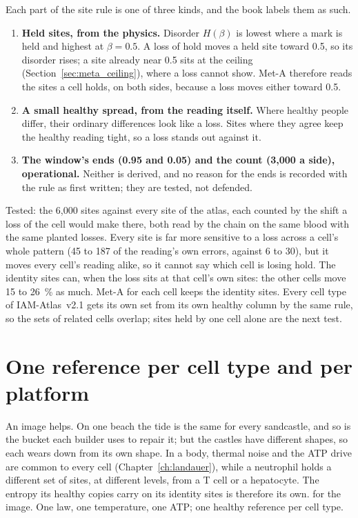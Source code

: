 Each part of the site rule is one of three kinds, and the book labels them as such.
\begin{enumerate}
\item \textbf{Held sites, from the physics.} Disorder $H(\beta)$ is lowest where a mark is held and highest at $\beta=0.5$. A loss of hold
      moves a held site toward 0.5, so its disorder rises; a site already near 0.5 sits at the ceiling (Section~\ref{sec:meta_ceiling}),
      where a loss cannot show. Met-A therefore reads the sites a cell holds, on both sides, because a loss moves either toward 0.5. \derived
\item \textbf{A small healthy spread, from the reading itself.} Where healthy people differ, their ordinary differences look like a loss.
      Sites where they agree keep the healthy reading tight, so a loss stands out against it.
\item \textbf{The window's ends (0.95 and 0.05) and the count (3,000 a side), operational.} Neither is derived, and no reason for the ends is
      recorded with the rule as first written; they are tested, not defended. \openprob
\end{enumerate}
Tested: the 6,000 sites against every site of the atlas, each counted by the shift a loss of the cell would make there, both read by the
chain on the same blood with the same planted losses. Every site is far more sensitive to a loss across a cell's whole pattern (45 to 187
of the reading's own errors, against 6 to 30), but it moves every cell's reading alike, so it cannot say which cell is losing hold. The
identity sites can, when the loss sits at that cell's own sites: the other cells move 15 to 26~\% as much. Met-A for each cell keeps the
identity sites. \measured{} Every cell type of IAM-Atlas~v2.1 gets its own set from its own healthy column by the same rule, so the sets
of related cells overlap; sites held by one cell alone are the next test. \openprob

\section{One reference per cell type and per platform}

An image helps. On one beach the tide is the same for every sandcastle, and so is the bucket each builder uses to repair it; but the
castles have different shapes, so each wears down from its own shape. In a body, thermal noise and the ATP drive are common to
every cell (Chapter~\ref{ch:landauer}), while a neutrophil holds a different set of sites, at different levels, from a T cell or a
hepatocyte. The entropy its healthy copies carry on its identity sites is therefore its own. \analogy{} for the image. One law,
one temperature, one ATP; one healthy reference per cell type.

